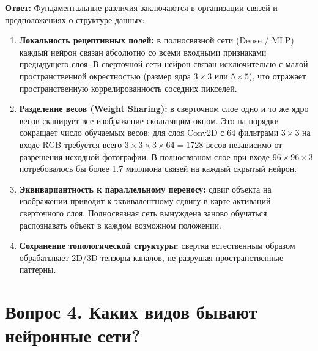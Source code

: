 \textbf{Ответ:}
Фундаментальные различия заключаются в организации связей и предположениях о структуре данных:
\begin{enumerate}
    \item \textbf{Локальность рецептивных полей:} в полносвязной сети (Dense / MLP) каждый нейрон связан абсолютно со всеми входными признаками предыдущего слоя. В сверточной сети нейрон связан исключительно с малой пространственной окрестностью (размер ядра $3\times3$ или $5\times5$), что отражает пространственную коррелированность соседних пикселей.
    \item \textbf{Разделение весов (Weight Sharing):} в сверточном слое одно и то же ядро весов сканирует все изображение скользящим окном. Это на порядки сокращает число обучаемых весов: для слоя Conv2D с 64 фильтрами $3\times3$ на входе RGB требуется всего $3 \times 3 \times 3 \times 64 = 1728$ весов независимо от разрешения исходной фотографии. В полносвязном слое при входе $96\times96\times3$ потребовалось бы более 1.7 миллиона связей на каждый скрытый нейрон.
    \item \textbf{Эквивариантность к параллельному переносу:} сдвиг объекта на изображении приводит к эквивалентному сдвигу в карте активаций сверточного слоя. Полносвязная сеть вынуждена заново обучаться распознавать объект в каждом возможном положении.
    \item \textbf{Сохранение топологической структуры:} свертка естественным образом обрабатывает 2D/3D тензоры каналов, не разрушая пространственные паттерны.
\end{enumerate}

\section*{Вопрос 4. Каких видов бывают нейронные сети?}

